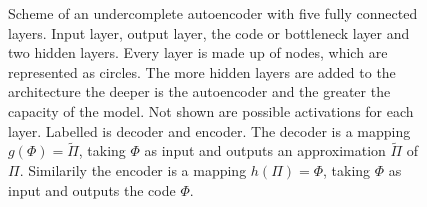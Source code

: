 \begin{figure}
	\centering
	
	\caption{\footnotesize Scheme of an undercomplete autoencoder with five fully connected layers. Input layer, output layer, the code or bottleneck layer and two hidden layers. Every layer is made up of nodes, which are represented as circles. The more hidden layers are added to the architecture the deeper is the autoencoder and the greater the capacity of the model. Not shown are possible activations for each layer. Labelled is decoder and encoder. The decoder is a mapping \(g(\Phi)=\tilde{\Pi}\), taking \(\Phi\) as input and outputs an approximation \(\tilde{\Pi}\) of \(\Pi\). Similarily the encoder is a mapping \(h(\Pi)=\Phi\), taking \(\Phi\) as input and outputs the code \(\Phi\).}
	\label{Fig:Autoencoder}
\end{figure}
   
